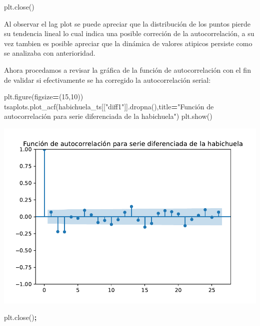 \documentclass[
]{book}
\newenvironment{Shaded}{\begin{snugshade}}{\end{snugshade}}
\newcommand{\DecValTok}[1]{\textcolor[rgb]{0.00,0.00,0.81}{#1}}
\newcommand{\NormalTok}[1]{#1}
\newcommand{\OperatorTok}[1]{\textcolor[rgb]{0.81,0.36,0.00}{\textbf{#1}}}
\newcommand{\StringTok}[1]{\textcolor[rgb]{0.31,0.60,0.02}{#1}}
\begin{document}
\begin{Shaded}
\begin{Highlighting}[]
\NormalTok{plt.close()}
\end{Highlighting}
\end{Shaded}

Al observar el lag plot se puede apreciar que la distribución de los puntos pierde su tendencia lineal lo cual indica una posible correción de la autocorrelación, a su vez tambien es posible apreciar que la dinámica de valores atipicos persiste como se analizaba con anterioridad.

Ahora procedamos a revisar la gráfica de la función de autocorrelación con el fin de validar si efectivamente se ha corregido la autocorrelación serial:

\begin{Shaded}
\begin{Highlighting}[]

\NormalTok{plt.figure(figsize}\OperatorTok{=}\NormalTok{(}\DecValTok{15}\NormalTok{,}\DecValTok{10}\NormalTok{))}
\NormalTok{tsaplots.plot\_acf(habichuela\_ts[[}\StringTok{"diff1"}\NormalTok{]].dropna(),title}\OperatorTok{=}\StringTok{"Función de autocorrelación para serie diferenciada de la habichuela"}\NormalTok{)}
\NormalTok{plt.show()}
\end{Highlighting}
\end{Shaded}

\includegraphics{bookdown-demo_files/figure-latex/unnamed-chunk-72-41.pdf}

\begin{Shaded}
\begin{Highlighting}[]
\NormalTok{plt.close()}\OperatorTok{;}
\end{Highlighting}
\end{Shaded}
\end{document}
